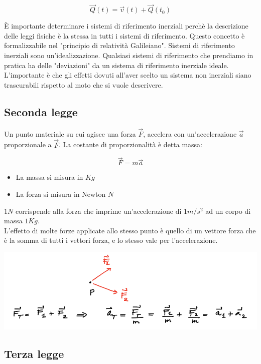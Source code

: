 \documentclass{subfiles}
\begin{document}
$$
\vec{Q}(t) = \vec{v}(t) + \vec{Q}(t_0)
$$

\noindent
È importante determinare i sistemi di riferimento inerziali perchè la descrizione delle leggi fisiche è la stessa in tutti i sistemi di riferimento.
Questo concetto è formalizzabile nel "principio di relatività Galileiano".
Sistemi di riferimento inerziali sono un'idealizzazione.
Qualsiasi sistemi di riferimento che prendiamo in pratica ha delle "deviazioni" da un sistema di riferimento inerziale ideale.
L'importante è che gli effetti dovuti all'aver scelto un sistema non inerziali siano trascurabili rispetto al moto che si vuole descrivere.

\subsection{Seconda legge}

Un punto materiale su cui agisce una forza $\vec{F}$, accelera con un'accelerazione $\vec{a}$ proporzionale a $\vec{F}$.
La costante di proporzionalità è detta massa:

$$
\vec{F} = m \vec{a}
$$

\begin{itemize}
    \item La massa si misura in $Kg$
    \item La forza si misura in Newton $N$
\end{itemize}

\noindent
$1N$ corrispende alla forza che imprime un'accelerazione di $1 m/s^2$ ad un corpo di massa $1 Kg$.\\

\noindent
L'effetto di molte forze applicate allo stesso punto è quello di un vettore forza che è la somma di tutti i vettori forza,
e lo stesso vale per l'accelerazione.

\includegraphics[width=\columnwidth]{seconda-legge-somma-forze}

\subsection{Terza legge}
\end{document}
